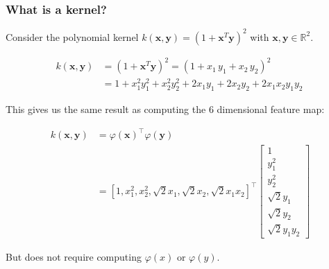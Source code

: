 \documentclass{beamer}
\begin{document}
    \begin{frame}
        \frametitle{What is a kernel?}
        Consider the polynomial kernel $k(\mathbf x, \mathbf y) = (1 + \mathbf x^T \mathbf y)^2$ with $\mathbf x, \mathbf y \in \mathbb R^2$.

        \begin{align}
            k(\mathbf x, \mathbf y) & = (1 + \mathbf x^T \mathbf y)^2 = (1 + x_1 \, y_1  + x_2 \, y_2)^2 \\
            & = 1 + x_1^2 y_1^2 + x_2^2 y_2^2 + 2 x_1 y_1 + 2 x_2 y_2 + 2 x_1 x_2 y_1 y_2 \
        \end{align}

        This gives us the same result as computing the 6 dimensional feature map:

        \begin{align}
            k(\mathbf x, \mathbf y) &= \varphi(\mathbf x)^\intercal \varphi(\mathbf y) \\
            &=[1, x_1^2, x_2^2, \sqrt{2} x_1, \sqrt{2} x_2, \sqrt{2} x_1 x_2]^\intercal\begin{bmatrix}1\\ y_1^2\\ y_2^2\\ \sqrt{2} y_1\\ \sqrt{2} y_2\\ \sqrt{2} y_1 y_2\end{bmatrix}
        \end{align}

        But does not require computing $\varphi(x)$ or $\varphi(y)$.
    \end{frame}
\end{document}
